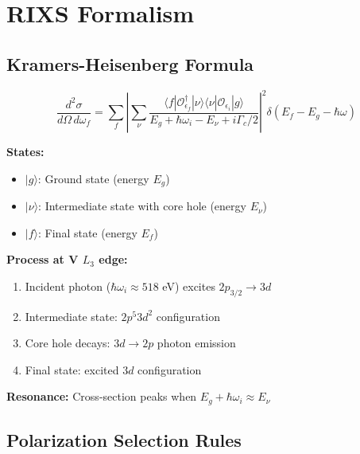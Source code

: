 \documentclass[11pt,letterpaper]{article}
\begin{document}
\section{RIXS Formalism}

\subsection{Kramers-Heisenberg Formula}

\begin{equation}
\boxed{
\frac{d^2\sigma}{d\Omega\, d\omega_f} = \sum_f \left|
\sum_\nu \frac{\langle f | \mathcal{O}_{\epsilon_f}^\dagger | \nu \rangle \langle \nu | \mathcal{O}_{\epsilon_i} | g \rangle}
{E_g + \hbar\omega_i - E_\nu + i\Gamma_c/2}
\right|^2 \delta(E_f - E_g - \hbar\omega)
}
\end{equation}

\begin{derivation}[title={Physical Interpretation}]
\textbf{States:}
\begin{itemize}
    \item $|g\rangle$: Ground state (energy $E_g$)
    \item $|\nu\rangle$: Intermediate state with core hole (energy $E_\nu$)
    \item $|f\rangle$: Final state (energy $E_f$)
\end{itemize}

\textbf{Process at V $L_3$ edge:}
\begin{enumerate}
    \item Incident photon ($\hbar\omega_i \approx 518$ eV) excites $2p_{3/2} \to 3d$
    \item Intermediate state: $2p^5 3d^2$ configuration
    \item Core hole decays: $3d \to 2p$ photon emission
    \item Final state: excited $3d$ configuration
\end{enumerate}

\textbf{Resonance:} Cross-section peaks when $E_g + \hbar\omega_i \approx E_\nu$
\end{derivation}

\subsection{Polarization Selection Rules}
\end{document}
